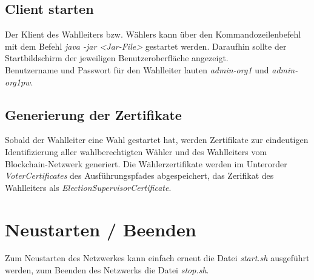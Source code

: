 \documentclass[parskip=full]{scrartcl}
\begin{document}
	\subsection{Client starten}
	Der Klient des Wahlleiters bzw. Wählers kann über den Kommandozeilenbefehl mit dem Befehl \textit{java -jar <Jar-File>} gestartet werden. Daraufhin sollte der Startbildschirm der jeweiligen Benutzeroberfläche angezeigt. \\
	Benutzername und Passwort für den Wahlleiter lauten \textit{admin-org1} und \textit{admin-org1pw}.

    \subsection{Generierung der Zertifikate}
    Sobald der Wahlleiter eine Wahl gestartet hat, werden Zertifikate zur eindeutigen Identifizierung aller wahlberechtigten Wähler und des Wahlleiters vom Blockchain-Netzwerk generiert. Die Wählerzertifikate werden im Unterorder \textit{VoterCertificates} des Ausführungspfades abgespeichert, das Zerifikat des Wahlleiters als \textit{ElectionSupervisorCertificate}.
    
    \section{Neustarten / Beenden}
    Zum Neustarten des Netzwerkes kann einfach erneut die Datei \textit{start.sh} ausgeführt werden,
    zum Beenden des Netzwerks die Datei \textit{stop.sh}.
		
\end{document}
